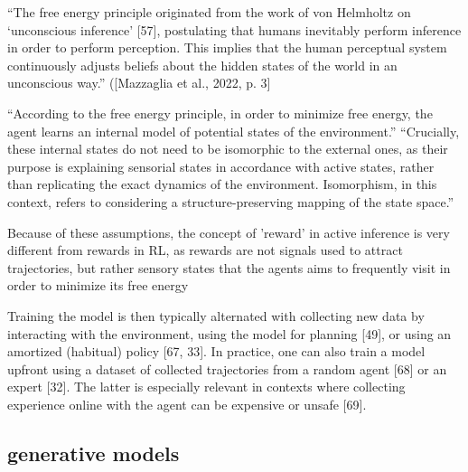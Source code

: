 \cite{mazzaglia_free_2022}
“The free energy principle originated from the work of von Helmholtz on ‘unconscious inference’ [57], postulating that humans inevitably perform inference in order to perform perception. This implies that the human perceptual system continuously adjusts beliefs about the hidden states of the world in an unconscious way.” ([Mazzaglia et al., 2022, p. 3]

“According to the free energy principle, in order to minimize free energy, the agent learns an internal model of potential states of the environment.”
“Crucially, these internal states do not need to be isomorphic to the external ones, as their purpose is explaining sensorial states in accordance with active states, rather than replicating the exact dynamics of the environment. Isomorphism, in this context, refers to considering a structure-preserving mapping of the state space.”

Because of these assumptions, the concept of 'reward' in active inference is very different from rewards in RL, as rewards are not signals used to attract trajectories, but rather sensory states that the agents aims to frequently visit in order to minimize its free energy

Training the model is then typically alternated with collecting new data by interacting with the environment, using the model for planning [49], or using an amortized (habitual) policy [67, 33]. In practice, one can also train a model upfront using a dataset of collected trajectories from a random agent [68] or an expert [32]. The latter is especially relevant in contexts where collecting experience online with the agent can be expensive or unsafe [69].


\subsection{generative models}

